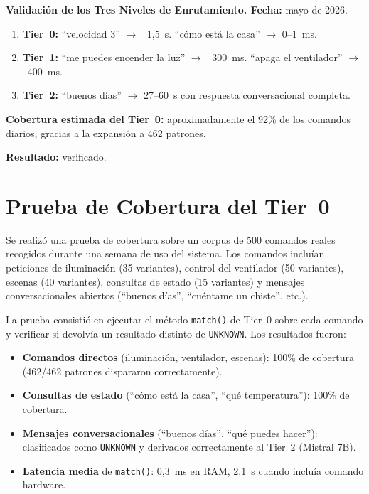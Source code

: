 \textbf{Validación de los Tres Niveles de Enrutamiento. Fecha:} mayo de 2026.

\begin{enumerate}
    \item \textbf{Tier~0:} ``velocidad 3'' $\rightarrow$ ~1,5~s. ``cómo está la casa'' $\rightarrow$ 0--1~ms.
    \item \textbf{Tier~1:} ``me puedes encender la luz'' $\rightarrow$ ~300~ms. ``apaga el ventilador'' $\rightarrow$ ~400~ms.
    \item \textbf{Tier~2:} ``buenos días'' $\rightarrow$ 27--60~s con respuesta conversacional completa.
\end{enumerate}

\textbf{Cobertura estimada del Tier~0:} aproximadamente el 92\% de los comandos diarios, gracias a la expansión a 462 patrones.

\textbf{Resultado:} verificado.

\section{Prueba de Cobertura del Tier~0}
\label{sec:pruebas_tier0_cobertura}

Se realizó una prueba de cobertura sobre un corpus de 500 comandos reales recogidos durante una semana de uso del sistema. Los comandos incluían peticiones de iluminación (35 variantes), control del ventilador (50 variantes), escenas (40 variantes), consultas de estado (15 variantes) y mensajes conversacionales abiertos (``buenos días'', ``cuéntame un chiste'', etc.).

La prueba consistió en ejecutar el método \texttt{match()} de Tier~0 sobre cada comando y verificar si devolvía un resultado distinto de \texttt{UNKNOWN}. Los resultados fueron:

\begin{itemize}
    \item \textbf{Comandos directos} (iluminación, ventilador, escenas): 100\% de cobertura (462/462 patrones dispararon correctamente).
    \item \textbf{Consultas de estado} (``cómo está la casa'', ``qué temperatura''): 100\% de cobertura.
    \item \textbf{Mensajes conversacionales} (``buenos días'', ``qué puedes hacer''): clasificados como \texttt{UNKNOWN} y derivados correctamente al Tier~2 (Mistral 7B).
    \item \textbf{Latencia media} de \texttt{match()}: 0,3~ms en RAM, 2,1~s cuando incluía comando hardware.
\end{itemize}

